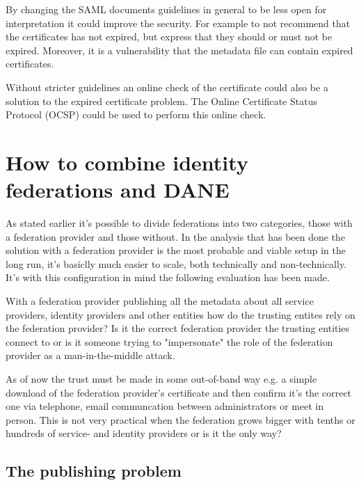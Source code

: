 By changing the SAML documents guidelines in general to be less open for interpretation it could improve the security. 
For example to not recommend that the certificates has not expired, but express that they should or must not be expired. 
Moreover, it is a vulnerability that the metadata file can contain expired certificates.

Without stricter guidelines an online check of the certificate could also be a solution to the expired certificate problem. 
The Online Certificate Status Protocol (OCSP) \cite{rfc:6277} could be used to perform this online check.

\section{How to combine identity federations and DANE}
As stated earlier it's possible to divide federations into two categories, those with a federation provider and those without.
In the analysis that has been done the solution with a federation provider is the most probable and viable setup in the long run, it's basiclly much easier to scale, both technically and non-technically.
It's with this configuration in mind the following evaluation has been made.


With a federation provider publishing all the metadata about all service providers, identity providers and other entities how do the trusting entites rely on the federation provider?
Is it the correct federation provider the trusting entities connect to or is it someone trying to "impersonate" the role of the federation provider as a man-in-the-middle attack.

As of now the trust must be made in some out-of-band way e.g. a simple download of the federation provider's certificate and then confirm it's the correct one via telephone, email communcation between administrators or meet in person.
This is not very practical when the federation grows bigger with tenths or hundreds of service- and identity providers or is it the only way?
\subsection{The publishing problem}
